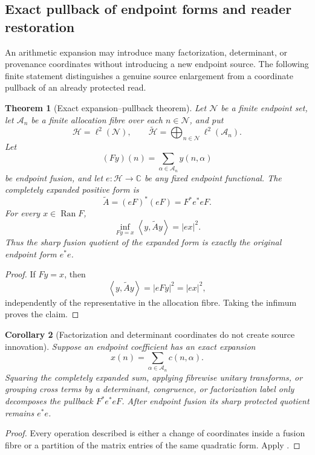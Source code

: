 \documentclass[11pt]{article}
\newtheorem{theorem}{Theorem}[section]
\newtheorem{corollary}[theorem]{Corollary}
\theoremstyle{definition}
\theoremstyle{remark}
\newcommand{\C}{\mathbb C}
\newcommand{\Ran}{\operatorname{Ran}}
\newcommand{\ip}[2]{\left\langle#1,#2\right\rangle}
\begin{document}
\subsection{Exact pullback of endpoint forms and reader restoration}
\label{subsec:arithmetic-pullback}

An arithmetic expansion may introduce many factorization, determinant, or
provenance coordinates without introducing a new endpoint source.  The
following finite statement distinguishes a genuine source enlargement from a
coordinate pullback of an already protected read.

\begin{theorem}[Exact expansion--pullback theorem]
\label{thm:arithmetic-expansion-pullback}
Let $\mathcal N$ be a finite endpoint set, let $\mathcal A_n$ be a finite
allocation fibre over each $n\in\mathcal N$, and put
\[
 \mathcal H=\ell^2(\mathcal N),
 \qquad
 \widetilde{\mathcal H}
 =\bigoplus_{n\in\mathcal N}\ell^2(\mathcal A_n).
\]
Let
\[
 (Fy)(n)=\sum_{\alpha\in\mathcal A_n}y(n,\alpha)
\]
be endpoint fusion, and let $e:\mathcal H\to\C$ be any fixed endpoint
functional.  The completely expanded positive form is
\[
 \boxed{\widetilde A=(eF)^*(eF)=F^*e^*eF.}
 \tag{L.1}
\]
For every $x\in\Ran F$,
\[
 \boxed{
 \inf_{Fy=x}\ip{y}{\widetilde Ay}=|ex|^2.}
 \tag{L.2}
\]
Thus the sharp fusion quotient of the expanded form is exactly the original
endpoint form $e^*e$.
\end{theorem}

\begin{proof}
If $Fy=x$, then
\[
 \ip{y}{\widetilde Ay}=|eFy|^2=|ex|^2,
\]
independently of the representative in the allocation fibre.  Taking the
infimum proves the claim.
\end{proof}

\begin{corollary}[Factorization and determinant coordinates do not create
source innovation]
\label{cor:arithmetic-factorization-pullback}
Suppose an endpoint coefficient has an exact expansion
\[
 x(n)=\sum_{\alpha\in\mathcal A_n}c(n,\alpha).
\]
Squaring the completely expanded sum, applying fibrewise unitary transforms,
or grouping cross terms by a determinant, congruence, or factorization label
only decomposes the pullback $F^*e^*eF$.  After endpoint fusion its sharp
protected quotient remains $e^*e$.
\end{corollary}

\begin{proof}
Every operation described is either a change of coordinates inside a fusion
fibre or a partition of the matrix entries of the same quadratic form.  Apply
.
\end{proof}
\end{document}
